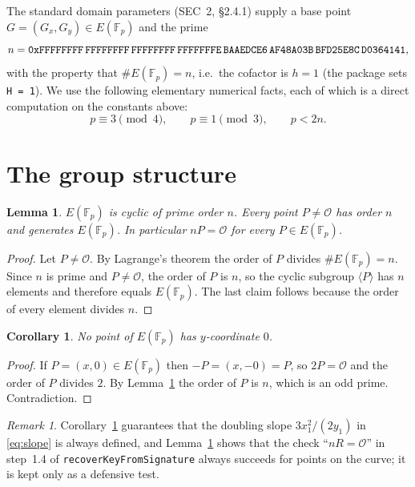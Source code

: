 \documentclass[11pt]{article}
\newtheorem{lemma}[theorem]{Lemma}
\newtheorem{corollary}[theorem]{Corollary}
\theoremstyle{definition}
\theoremstyle{remark}
\newtheorem{remark}[theorem]{Remark}
\newcommand{\F}{\mathbb{F}}
\newcommand{\Oinf}{\mathcal{O}}
\begin{document}
The standard domain parameters (SEC~2, \S2.4.1) supply a base point
$G=(G_x,G_y)\in E(\F_p)$ and the prime
\[
  n = \texttt{0xFFFFFFFF\,FFFFFFFF\,FFFFFFFF\,FFFFFFFE\,BAAEDCE6\,AF48A03B\,BFD25E8C\,D0364141},
\]
with the property that $\#E(\F_p) = n$, i.e.\ the cofactor is $h=1$
(the package sets \texttt{H = 1}). We use the following elementary numerical
facts, each of which is a direct computation on the constants above:
\begin{equation}\label{eq:facts}
  p \equiv 3 \pmod 4, \qquad p \equiv 1 \pmod 3, \qquad p < 2n .
\end{equation}

\section{The group structure}

\begin{lemma}\label{lem:cyclic}
$E(\F_p)$ is cyclic of prime order $n$. Every point $P\neq\Oinf$ has order $n$
and generates $E(\F_p)$. In particular $nP=\Oinf$ for every $P\in E(\F_p)$.
\end{lemma}

\begin{proof}
Let $P\neq\Oinf$. By Lagrange's theorem the order of $P$ divides
$\#E(\F_p)=n$. Since $n$ is prime and $P\neq\Oinf$, the order of $P$ is $n$, so
the cyclic subgroup $\langle P\rangle$ has $n$ elements and therefore equals
$E(\F_p)$. The last claim follows because the order of every element divides
$n$.
\end{proof}

\begin{corollary}\label{cor:no2torsion}
No point of $E(\F_p)$ has $y$-coordinate $0$.
\end{corollary}

\begin{proof}
If $P=(x,0)\in E(\F_p)$ then $-P=(x,-0)=P$, so $2P=\Oinf$ and the order of $P$
divides $2$. By Lemma~\ref{lem:cyclic} the order of $P$ is $n$, which is an odd
prime. Contradiction.
\end{proof}

\begin{remark}
Corollary~\ref{cor:no2torsion} guarantees that the doubling slope
$3x_1^2/(2y_1)$ in \eqref{eq:slope} is always defined, and
Lemma~\ref{lem:cyclic} shows that the check ``$nR=\Oinf$'' in step~1.4 of
\texttt{recoverKeyFromSignature} always succeeds for points on the curve; it is
kept only as a defensive test.
\end{remark}
\end{document}

